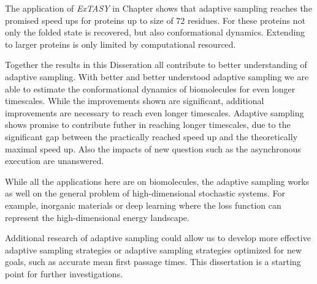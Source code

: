 The application of \emph{ExTASY} in Chapter \label{ch:chapter5} shows that adaptive sampling reaches the promised speed ups for proteins up to size of 72 residues. For these proteins not only the folded state is recovered, but also conformational dynamics. Extending to larger proteins is only limited by computational resourced.

Together the results in this Disseration all contribute to better understanding of adaptive sampling. With better and better understood  adaptive sampling we are able to estimate the conformational dynamics of biomolecules for even longer timescales.  While the improvements shown are significant, additional improvements are necessary to reach even longer timescales. Adaptive sampling shows promise to contribute futher in reaching longer timescales, due to the significant gap between the practically reached speed up and the theoretically maximal speed up. Also the impacts of new question such as the asynchronous execution are unanswered.

While all the applications here are on biomolecules, the adaptive sampling works as well on the general problem of high-dimensional stochastic systems. For example, inorganic materials or deep learning where the loss function can represent the high-dimensional energy landscape.

Additional research of adaptive sampling could allow us to develop more effective adaptive sampling strategies or adaptive sampling strategies optimized for new goals, such as accurate mean first passage times. This dissertation is a starting point for further investigations.

